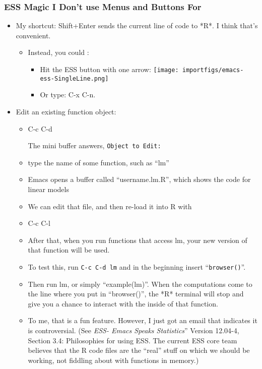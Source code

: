 \documentclass[11pt,english]{beamer}
\newcommand{\code}[1]{\texttt{#1}}
\begin{document}
\begin{frame}
  \frametitle{ESS Magic I Don't use Menus and Buttons For}
  \begin{itemize}
  \item My shortcut: Shift+Enter sends the current line of code to {*}R{*}.
    I think that's convenient.

    \begin{itemize}
    \item Instead, you could :

      \begin{itemize}
      \item Hit the ESS button with one arrow: \texttt{[image: importfigs/emacs-ess-SingleLine.png]}
      \item Or type: C-x C-n.
      \end{itemize}
    \end{itemize}
  \item Edit an existing function object:

    \begin{itemize}
    \item C-c C-d


      The mini buffer answers, \lstinline!Object to Edit:!

    \item type the name of some function, such as ``lm''
    \item Emacs opens a buffer called ``username.lm.R'', which shows the code
      for linear models
    \item We can edit that file, and then re-load it into R with
    \item C-c C-l
    \item After that, when you run functions that access lm, your new version
      of that function will be used.
    \item To test this, run \lstinline!C-c C-d lm! and in the beginning insert
      ``\code{browser()}''.
    \item Then run lm, or simply ``example(lm)''. When the computations come
      to the line where you put in ``browser()'', the {*}R{*} terminal
      will stop and give you a chance to interact with the inside of that
      function. 
    \item To me, that is a fun feature. However, I just got an email that indicates
      it is controversial. (See \emph{ESS- Emacs Speaks Statistics}'' Version
      12.04-4, Section 3.4: Philosophies for using ESS. The current ESS
      core team believes that the R code files are the ``real'' stuff
      on which we should be working, not fiddling about with functions in
      memory.)
    \end{itemize}
  \end{itemize}
\end{frame}
\end{document}
